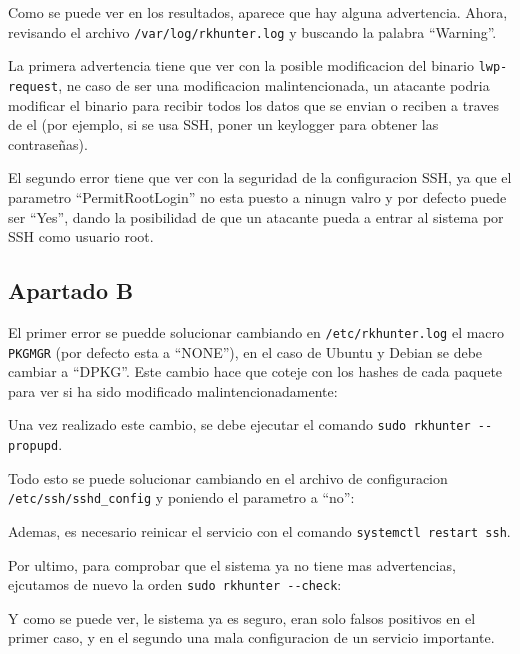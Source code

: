 \documentclass{article}
\begin{document}

Como se puede ver en los resultados, aparece que hay alguna advertencia. Ahora, revisando el archivo \verb|/var/log/rkhunter.log| y buscando la palabra ``Warning''.


La primera advertencia tiene que ver con la posible modificacion del binario \verb|lwp-request|, ne caso de ser una modificacion malintencionada, un atacante podria modificar el binario para recibir todos los datos que se envian o reciben a traves de el (por ejemplo, si se usa SSH, poner un keylogger para obtener las contraseñas).

El segundo error tiene que ver con la seguridad de la configuracion SSH, ya que el parametro ``PermitRootLogin'' no esta puesto a ninugn valro y por defecto puede ser ``Yes'', dando la posibilidad de que un atacante pueda a entrar al sistema por SSH como usuario root.


\subsection*{Apartado B}
El primer error se puedde solucionar cambiando en \verb|/etc/rkhunter.log| el macro \verb|PKGMGR| (por defecto esta a ``NONE''), en el caso de Ubuntu y Debian se debe cambiar a ``DPKG''. Este cambio hace que coteje con los hashes de cada paquete para ver si ha sido modificado malintencionadamente:


Una vez realizado este cambio, se debe ejecutar el comando \verb|sudo rkhunter --propupd|.


Todo esto se puede solucionar cambiando en el archivo de configuracion \verb|/etc/ssh/sshd_config| y poniendo el parametro a ``no'':


Ademas, es necesario reinicar el servicio con el comando \verb|systemctl restart ssh|.

Por ultimo, para comprobar que el sistema ya no tiene mas advertencias, ejcutamos de nuevo la orden \verb|sudo rkhunter --check|:


Y como se puede ver, le sistema ya es seguro, eran solo falsos positivos en el primer caso, y en el segundo una mala configuracion de un servicio importante.
\end{document}

